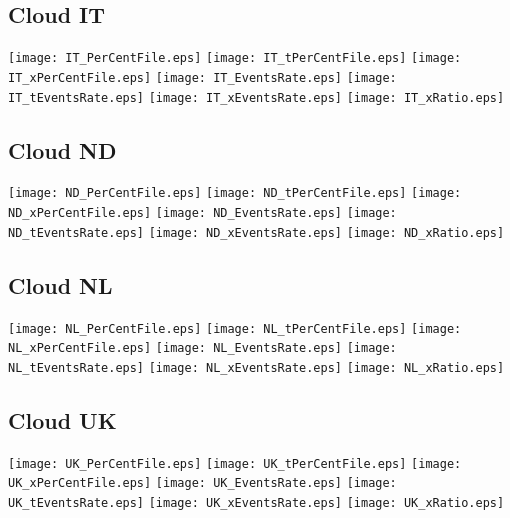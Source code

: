 \subsection{Cloud IT}
\texttt{[image: IT\_PerCentFile.eps]}
\texttt{[image: IT\_tPerCentFile.eps]}
\texttt{[image: IT\_xPerCentFile.eps]}
\texttt{[image: IT\_EventsRate.eps]}
\texttt{[image: IT\_tEventsRate.eps]}
\texttt{[image: IT\_xEventsRate.eps]}
\texttt{[image: IT\_xRatio.eps]}
\vspace{1ex}\\

\subsection{Cloud ND}
\texttt{[image: ND\_PerCentFile.eps]}
\texttt{[image: ND\_tPerCentFile.eps]}
\texttt{[image: ND\_xPerCentFile.eps]}
\texttt{[image: ND\_EventsRate.eps]}
\texttt{[image: ND\_tEventsRate.eps]}
\texttt{[image: ND\_xEventsRate.eps]}
\texttt{[image: ND\_xRatio.eps]}
\vspace{1ex}\\

\subsection{Cloud NL}
\texttt{[image: NL\_PerCentFile.eps]}
\texttt{[image: NL\_tPerCentFile.eps]}
\texttt{[image: NL\_xPerCentFile.eps]}
\texttt{[image: NL\_EventsRate.eps]}
\texttt{[image: NL\_tEventsRate.eps]}
\texttt{[image: NL\_xEventsRate.eps]}
\texttt{[image: NL\_xRatio.eps]}
\vspace{1ex}\\

\subsection{Cloud UK}
\texttt{[image: UK\_PerCentFile.eps]}
\texttt{[image: UK\_tPerCentFile.eps]}
\texttt{[image: UK\_xPerCentFile.eps]}
\texttt{[image: UK\_EventsRate.eps]}
\texttt{[image: UK\_tEventsRate.eps]}
\texttt{[image: UK\_xEventsRate.eps]}
\texttt{[image: UK\_xRatio.eps]}
\vspace{1ex}\\

